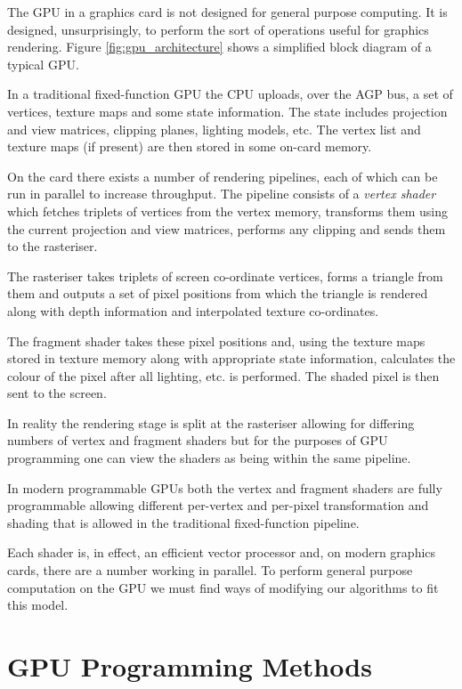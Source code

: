 The GPU in a graphics card is not designed for general purpose 
computing. It is designed, unsurprisingly, to perform the
sort of operations useful for graphics rendering. Figure
\ref{fig:gpu_architecture} shows a simplified block diagram of
a typical GPU.

In a traditional fixed-function GPU the CPU uploads, over the AGP
bus, a set of vertices, texture maps and some state information. The
state includes projection and view matrices, clipping planes, 
lighting models, etc. The vertex list and texture maps (if present) 
are then stored in some on-card memory.

On the card there exists a number of rendering pipelines, each of which
can be run in parallel to increase throughput. The pipeline consists
of a \emph{vertex shader} which fetches triplets of vertices from
the vertex memory, transforms them using the current projection and 
view matrices, performs any clipping and sends them to the rasteriser.

The rasteriser takes triplets of screen co-ordinate vertices, forms
a triangle from them and outputs a set of pixel positions from which
the triangle is rendered along with depth information and interpolated texture
co-ordinates. 

The fragment shader takes these pixel positions and, using the texture maps
stored in texture memory along with appropriate state information, calculates
the colour of the pixel after all lighting, etc. is performed. The shaded pixel
is then sent to the screen.

In reality the rendering stage is split at the rasteriser allowing for differing
numbers of vertex and fragment shaders but for the purposes of GPU programming
one can view the shaders as being within the same pipeline.

In modern programmable GPUs both the vertex and fragment shaders are fully 
programmable allowing different per-vertex and per-pixel transformation
and shading that is allowed in the traditional fixed-function pipeline.

Each shader is, in effect, an efficient vector processor and, on modern 
graphics cards, there are a number working in parallel. To perform
general purpose computation on the GPU we must find ways of modifying our
algorithms to fit this model.

\section{GPU Programming Methods}

